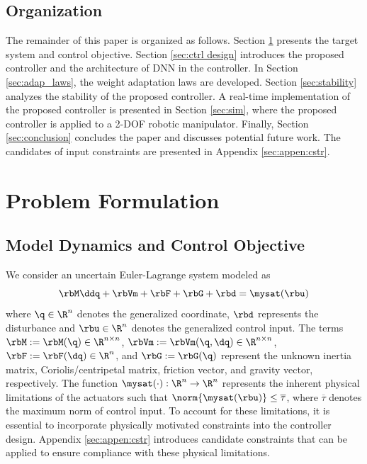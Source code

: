 \documentclass[lettersize,journal]{IEEEtran}
\begin{document}
\subsection{Organization}

The remainder of this paper is organized as follows. 
Section \ref{sec:Problem Formulation} presents the target system and control objective.
Section \ref{sec:ctrl design} introduces the proposed controller and the architecture of DNN in the controller. 
In Section \ref{sec:adap_laws}, the weight adaptation laws are developed.
Section \ref{sec:stability} analyzes the stability of the proposed controller.
A real-time implementation of the proposed controller is presented in Section \ref{sec:sim}, where the proposed controller is applied to a 2-DOF robotic manipulator.
Finally, Section \ref{sec:conclusion} concludes the paper and discusses potential future work.
The candidates of input constraints are presented in Appendix \ref{sec:appen:cstr}.

\section{Problem Formulation}\label{sec:Problem Formulation}

\subsection{Model Dynamics and Control Objective}

We consider an uncertain Euler-Lagrange system modeled as
\begin{equation}
    \rbM\ddq + \rbVm + \rbF + \rbG + \rbd
    =
    \mysat(\rbu)
    \label{eq:sys1}
\end{equation}
where $\q\in \R^n$ denotes the generalized coordinate, $\rbd$ represents the disturbance and $\rbu\in\R^n$ denotes the generalized control input. 
The terms $\rbM:=\rbM(\q)\in\R^{n\times n}$, $\rbVm:=\rbVm(\q,\dq)\in\R^{n\times n}$, $\rbF:=\rbF(\dq)\in\R^{n}$, and $\rbG:=\rbG(\q)$ represent the unknown inertia matrix, Coriolis/centripetal matrix, friction vector, and gravity vector, respectively.
The function $\mysat(\cdot):\R^n\to\R^n$ represents the inherent physical limitations of the actuators such that $\norm{\mysat(\rbu)}\le \overline\tau$, where $\overline\tau$ denotes the maximum norm of control input.
To account for these limitations, it is essential to incorporate physically motivated constraints into the controller design.
Appendix \ref{sec:appen:cstr} introduces candidate constraints that can be applied to ensure compliance with these physical limitations.
\end{document}
